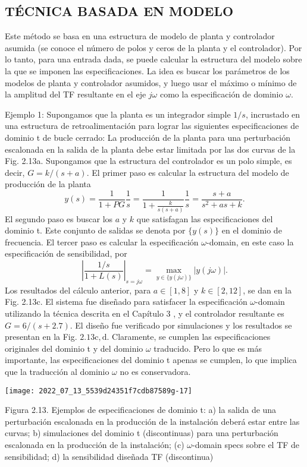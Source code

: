 \subsection{TÉCNICA BASADA EN MODELO}
Este método se basa en una estructura de modelo de planta y controlador asumida (se conoce el número de polos y ceros de la planta y el controlador). Por lo tanto, para una entrada dada, se puede calcular la estructura del modelo sobre la que se imponen las especificaciones. La idea es buscar los parámetros de los modelos de planta y controlador asumidos, y luego usar el máximo o mínimo de la amplitud del TF resultante en el eje $j \omega$ como la especificación de dominio $\omega$.

Ejemplo 1: Supongamos que la planta es un integrador simple $1 / s$, incrustado en una estructura de retroalimentación para lograr las siguientes especificaciones de dominio t de bucle cerrado: La producción de la planta para una perturbación escalonada en la salida de la planta debe estar limitada por las dos curvas de la Fig. 2.13a. Supongamos que la estructura del controlador es un polo simple, es decir, $G=k /(s+a)$. El primer paso es calcular la estructura del modelo de producción de la planta
$$
y(s)=\frac{1}{1+P G} \frac{1}{s}=\frac{1}{1+\frac{k}{s(s+a)}} \frac{1}{s}=\frac{s+a}{s^{2}+a s+k} .
$$
El segundo paso es buscar los $a$ y $k$ que satisfagan las especificaciones del dominio t. Este conjunto de salidas se denota por $\{y(s)\}$ en el dominio de frecuencia. El tercer paso es calcular la especificación $\omega$-domain, en este caso la especificación de sensibilidad, por
$$
\left|\frac{1 / s}{1+L(s)}\right|_{s=j \omega}=\max _{y \in\{y(j \omega)\}}|y(j \omega)| .
$$
Los resultados del cálculo anterior, para $a \in[1,8]$ y $k \in[2,12]$, se dan en la Fig. 2.13c. El sistema fue diseñado para satisfacer la especificación $\omega$-domain utilizando la técnica descrita en el Capítulo 3 , y el controlador resultante es $G=6 /(s+2.7)$. El diseño fue verificado por simulaciones y los resultados se presentan en la Fig. $2.13 \mathrm{c}, \mathrm{d}$. Claramente, se cumplen las especificaciones originales del dominio t y del dominio $\omega$ traducido. Pero lo que es más importante, las especificaciones del dominio t apenas se cumplen, lo que implica que la traducción al dominio $\omega$ no es conservadora.

\texttt{[image: 2022\_07\_13\_5539d24351f7cdb87589g-17]}

Figura 2.13. Ejemplos de especificaciones de dominio t: a) la salida de una perturbación escalonada en la producción de la instalación deberá estar entre las curvas; b) simulaciones del dominio t (discontinuas) para una perturbación escalonada en la producción de la instalación; (c) $\omega$-domain specs sobre el TF de sensibilidad; d) la sensibilidad diseñada TF (discontinua)

